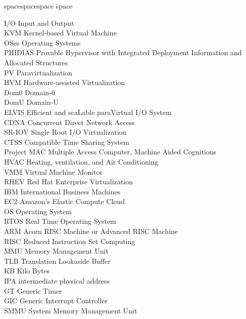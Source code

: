 
\begin{tabbing}
spacespacespace \= space \kill

I/O   \> Input and Output \\
KVM   \> Kernel-based Virtual Machine \\
OSes  \> Operating Systems \\
PHIDIAS	 \> Provable Hypervisor with Integrated Deployment Information and Allocated Structures	 \\
PV 	 \> Paravirtualization 	 \\
HVM	 \>  Hardware-assisted Virtualization \\
Dom0	 \> Domain-0 \\
DomU	 \>  Domain-U	 \\
ELVIS  \> Efficient and scaLable paraVirtual I/O System \\
CDNA    \> Concurrent Direct Network Access \\
SR-IOV  \> Single Root I/O Virtualization  \\
CTSS   \> Compatible Time Sharing System \\
Project MAC \>  Multiple Access Computer, Machine Aided Cognitions \\
HVAC   \>  Heating, ventilation, and Air Conditioning \\
VMM  \> Virtual Machine Monitor \\
RHEV  \> Red Hat Enterprise Virtualization \\
IBM     \>  International Business Machines  \\
EC2 \> Amazon's Elastic Compute Cloud    \\
OS  \> Operating System \\
RTOS     \>  Real Time Operating System     \\
ARM \>  Acorn RISC Machine  or Advanced RISC Machine   \\
RISC     \>   Reduced Instruction Set Computing    \\
MMU  \> Memory Management Unit \\
TLB  \> Translation Lookaside Buffer \\
KB   \> Kilo Bytes \\
IPA  \> intermediate physical address \\
GT  \> Generic Timer \\
GIC  \> Generic Interrupt Controller \\
SMMU  \> System Memory Management Unit \\

\end{tabbing}
